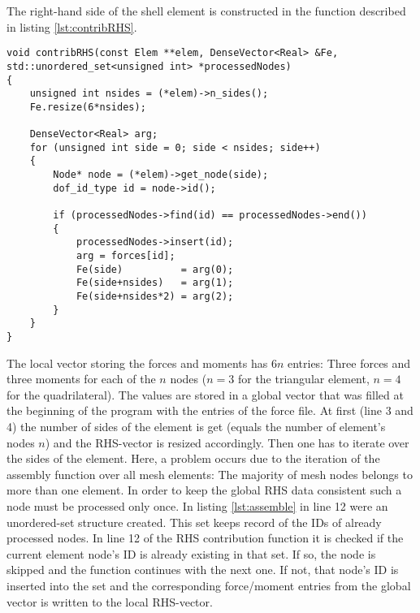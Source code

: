   The right-hand side of the shell element is constructed in the function described in listing \ref{lst:contribRHS}.
\begin{lstlisting}[caption=Contribute RHS function,label=lst:contribRHS]
void contribRHS(const Elem **elem, DenseVector<Real> &Fe, std::unordered_set<unsigned int> *processedNodes)
{
	unsigned int nsides = (*elem)->n_sides();
	Fe.resize(6*nsides);
	
	DenseVector<Real> arg;
	for (unsigned int side = 0; side < nsides; side++)
	{
		Node* node = (*elem)->get_node(side);
		dof_id_type id = node->id();
		
		if (processedNodes->find(id) == processedNodes->end())
		{
			processedNodes->insert(id);
			arg = forces[id];			
			Fe(side)          = arg(0);
			Fe(side+nsides)   = arg(1);
			Fe(side+nsides*2) = arg(2);
		}
	}
}
\end{lstlisting}
   The local vector storing the forces and moments has $6n$ entries: Three forces and three moments for each of the $n$ nodes ($n=3$ for the triangular element, $n=4$ for the quadrilateral). The values are stored in a global vector that was filled at the beginning of the program with the entries of the force file. At first (line 3 and 4) the number of sides of the element is get (equals the number of element's nodes $n$) and the RHS-vector is resized accordingly. Then one has to iterate over the sides of the element. Here, a problem occurs due to the iteration of the assembly function over all mesh elements: The majority of mesh nodes belongs to more than one element. In order to keep the global RHS data consistent such a node must be processed only once. In listing \ref{lst:assemble} in line 12 were an unordered-set structure created. This set keeps record of the IDs of already processed nodes. In line 12 of the RHS contribution function it is checked if the current element node's ID is already existing in that set. If so, the node is skipped and the function continues with the next one. If not, that node's ID is inserted into the set and the corresponding force/moment entries from the global vector is written to the local RHS-vector.



   
   

